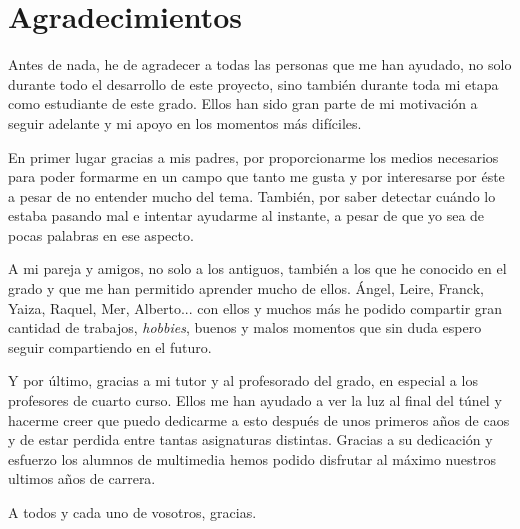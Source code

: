 \cleardoublepage %
\chapter{Agradecimientos}
Antes de nada, he de agradecer a todas las personas que me han ayudado, no solo durante todo el desarrollo de este proyecto, sino también durante toda mi etapa como estudiante de este grado. Ellos han sido gran parte de mi motivación a seguir adelante y mi apoyo en los momentos más difíciles.

\vspace{0.5cm}

En primer lugar gracias a mis padres, por proporcionarme los medios necesarios para poder formarme en un campo que tanto me gusta y por interesarse por éste a pesar de no entender mucho del tema. También, por saber detectar cuándo lo estaba pasando mal e intentar ayudarme al instante, a pesar de que yo sea de pocas palabras en ese aspecto.

\vspace{0.5cm}

A mi pareja y amigos, no solo a los antiguos, también a los que he conocido en el grado y que me han permitido aprender mucho de ellos. Ángel, Leire, Franck, Yaiza, Raquel, Mer, Alberto... con ellos y muchos más he podido compartir gran cantidad de trabajos, \textit{hobbies}, buenos y malos momentos que sin duda espero seguir compartiendo en el futuro.

\vspace{0.5cm}

Y por último, gracias a mi tutor y al profesorado del grado, en especial a los profesores de cuarto curso. Ellos me han ayudado a ver la luz al final del túnel y hacerme creer que puedo dedicarme a esto después de unos primeros años de caos y de estar perdida entre tantas asignaturas distintas. Gracias a su dedicación y esfuerzo los alumnos de multimedia hemos podido disfrutar al máximo nuestros ultimos años de carrera.

\vspace{0.5cm}

A todos y cada uno de vosotros, gracias.

\thispagestyle{empty}





\cleardoublepage %
